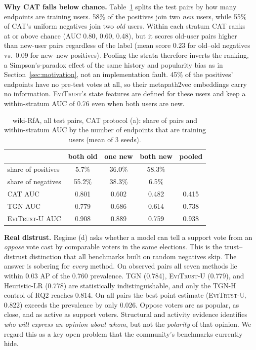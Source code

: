 \documentclass[conference]{IEEEtran}
\newcommand{\evi}{\textsc{EviTrust}}
\newcommand{\eviU}{\textsc{EviTrust}-U}
\begin{document}
\textbf{Why CAT falls below chance.} Table~\ref{tab:strata} splits the test pairs by how many endpoints are training users. 58\% of the positives join two \emph{new} users, while 55\% of CAT's uniform negatives join two \emph{old} users. Within each stratum CAT ranks at or above chance (AUC 0.80, 0.60, 0.48), but it scores old-user pairs higher than new-user pairs regardless of the label (mean score 0.23 for old--old negatives vs.\ 0.09 for new--new positives). Pooling the strata therefore inverts the ranking, a Simpson's-paradox effect of the same history and popularity bias as in Section~\ref{sec:motivation}, not an implementation fault. 45\% of the positives' endpoints have no pre-test votes at all, so their metapath2vec embeddings carry no information. \evi{}'s state features are defined for these users and keep a within-stratum AUC of 0.76 even when both users are new.

\begin{table}[t]
\centering
\caption{wiki-RfA, all test pairs, CAT protocol (a): share of pairs and within-stratum AUC by the number of endpoints that are training users (mean of 3 seeds).}
\label{tab:strata}
\setlength{\tabcolsep}{4pt}
\begin{tabular}{lccc|c}
\toprule
& both old & one new & both new & pooled \\
\midrule
share of positives & 5.7\% & 36.0\% & 58.3\% & \\
share of negatives & 55.2\% & 38.3\% & 6.5\% & \\
\midrule
CAT AUC & 0.801 & 0.602 & 0.482 & 0.415 \\
TGN AUC & 0.779 & 0.686 & 0.614 & 0.738 \\
\eviU{} AUC & 0.908 & 0.889 & 0.759 & 0.938 \\
\bottomrule
\end{tabular}
\end{table}

\textbf{Real distrust.} Regime (d) asks whether a model can tell a support vote from an \emph{oppose} vote cast by comparable voters in the same elections. This is the trust--distrust distinction that all benchmarks built on random negatives skip. The answer is sobering for \emph{every} method. On observed pairs all seven methods lie within $0.03$ AP of the 0.760 prevalence. TGN (0.784), \eviU{} (0.779), and Heuristic-LR (0.778) are statistically indistinguishable, and only the TGN-H control of RQ2 reaches 0.814. On all pairs the best point estimate (\eviU{}, 0.822) exceeds the prevalence by only 0.026. Oppose voters are as popular, as close, and as active as support voters. Structural and activity evidence identifies \emph{who will express an opinion about whom}, but not the \emph{polarity} of that opinion. We regard this as a key open problem that the community's benchmarks currently hide.
\end{document}
